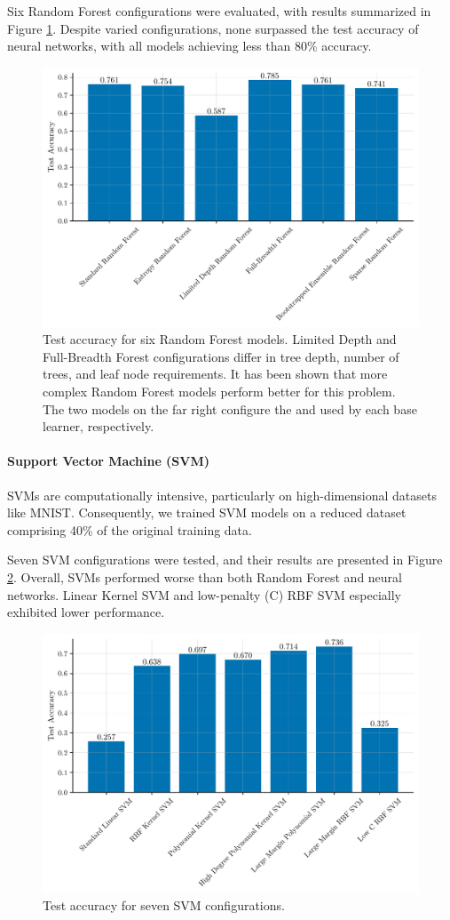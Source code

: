 \documentclass{article}
\begin{document}
Six Random Forest configurations were evaluated, with results summarized in Figure \ref{fig:rf}. Despite varied configurations, none surpassed the test accuracy of neural networks, with all models achieving less than 80\% accuracy.

\begin{figure}[!htbp]
    \centering
    \includegraphics[width=0.8\linewidth]{./images/rf_comparison.pdf}
    \caption{Test accuracy for six Random Forest models. Limited Depth and Full-Breadth Forest configurations differ in tree depth, number of trees, and leaf node requirements. It has been shown that more complex Random Forest models perform better for this problem. The two models on the far right configure the  and  used by each base learner, respectively.}
\label{fig:rf}
\end{figure}

\paragraph{Support Vector Machine (SVM)}
SVMs are computationally intensive, particularly on high-dimensional datasets like MNIST. Consequently, we trained SVM models on a reduced dataset comprising 40\% of the original training data.

Seven SVM configurations were tested, and their results are presented in Figure \ref{fig:svm}. Overall, SVMs performed worse than both Random Forest and neural networks. Linear Kernel SVM and low-penalty (C) RBF SVM especially exhibited lower performance.

\begin{figure}[!htbp]
    \centering
    \includegraphics[width=0.8\linewidth]{./images/svm_comparison.pdf}
    \caption{Test accuracy for seven SVM configurations.}
\label{fig:svm}
\end{figure}
\end{document}
